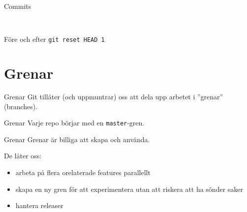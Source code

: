 \documentclass[11pt,xetex]{beamer}
\begin{document}
\begin{frame}{Commits}
  \captionsetup{type=table}
  \begin{figure}[t!]
      \begin{subfigure}[b]{0.5\textwidth}
        \centering
      \end{subfigure}%
      ~
      \begin{subfigure}[b]{0.5\textwidth}
        \centering
      \end{subfigure}
  \end{figure}

  \center
  Före och efter \texttt{git reset HEAD~1}
\end{frame}


\section*{Grenar}

\begin{frame}{Grenar}
  \Large
  Git tillåter (och uppmuntrar) oss att dela upp arbetet i ''grenar''
  (branches).
\end{frame}

\begin{frame}{Grenar}
  \Large
  Varje repo börjar med en \texttt{master}-gren.
\end{frame}

\begin{frame}{Grenar}
  \Large
  Grenar är billiga att skapa och använda.

  De låter oss:

  \normalsize
  \begin{itemize}
    \item arbeta på flera orelaterade features parallellt
    \item skapa en ny gren för att experimentera utan att riskera att ha
        sönder saker
    \item hantera releaser
  \end{itemize}
\end{frame}
\end{document}
